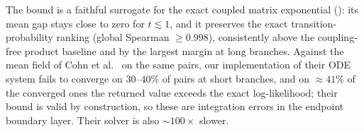 \documentclass{article}
\newcommand{\Metrop}{\textsc{Metropolis}}
\begin{document}
The bound is a faithful surrogate for the exact coupled matrix exponential
(): its mean gap stays close to zero for $t\lesssim1$, and it
preserves the exact transition-probability ranking (global Spearman $\ge0.998$),
consistently above the coupling-free product baseline and by the largest margin at long
branches. Against the mean field of Cohn et al.~\cite{cohn2010} on the same pairs, our
implementation of their ODE system fails to converge on $30$--$40\%$ of pairs at short
branches, and on $\approx41\%$ of the converged ones the returned value exceeds the exact
log-likelihood; their bound is valid by construction, so these are integration errors in
the endpoint boundary layer. Their solver is also $\sim100\times$ slower.



\end{document}
